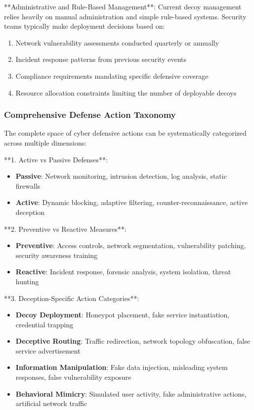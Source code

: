\documentclass[12pt,twoside]{article}
\theoremstyle{definition}
\theoremstyle{plain}
\begin{document}
**Administrative and Rule-Based Management**: Current decoy management relies heavily on manual administration and simple rule-based systems. Security teams typically make deployment decisions based on:

\begin{enumerate}
\item Network vulnerability assessments conducted quarterly or annually
\item Incident response patterns from previous security events
\item Compliance requirements mandating specific defensive coverage
\item Resource allocation constraints limiting the number of deployable decoys
\end{enumerate}

\subsubsection{Comprehensive Defense Action Taxonomy}

The complete space of cyber defensive actions can be systematically categorized across multiple dimensions:

**1. Active vs Passive Defenses**:
\begin{itemize}
\item \textbf{Passive}: Network monitoring, intrusion detection, log analysis, static firewalls
\item \textbf{Active}: Dynamic blocking, adaptive filtering, counter-reconnaissance, active deception
\end{itemize}

**2. Preventive vs Reactive Measures**:
\begin{itemize}
\item \textbf{Preventive}: Access controls, network segmentation, vulnerability patching, security awareness training
\item \textbf{Reactive}: Incident response, forensic analysis, system isolation, threat hunting
\end{itemize}

**3. Deception-Specific Action Categories**:
\begin{itemize}
\item \textbf{Decoy Deployment}: Honeypot placement, fake service instantiation, credential trapping
\item \textbf{Deceptive Routing}: Traffic redirection, network topology obfuscation, false service advertisement
\item \textbf{Information Manipulation}: Fake data injection, misleading system responses, false vulnerability exposure
\item \textbf{Behavioral Mimicry}: Simulated user activity, fake administrative actions, artificial network traffic
\end{itemize}
\end{document}
